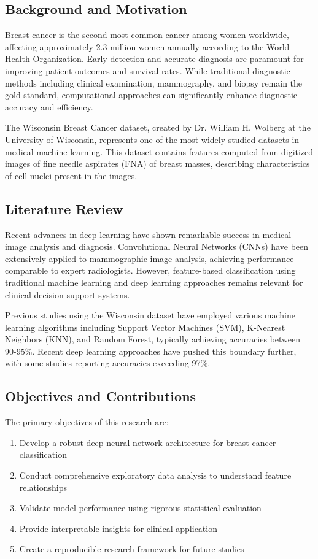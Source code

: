 \documentclass[12pt,a4paper]{article}
\begin{document}
\subsection{Background and Motivation}

Breast cancer is the second most common cancer among women worldwide, affecting approximately 2.3 million women annually according to the World Health Organization. Early detection and accurate diagnosis are paramount for improving patient outcomes and survival rates. While traditional diagnostic methods including clinical examination, mammography, and biopsy remain the gold standard, computational approaches can significantly enhance diagnostic accuracy and efficiency.

The Wisconsin Breast Cancer dataset, created by Dr. William H. Wolberg at the University of Wisconsin, represents one of the most widely studied datasets in medical machine learning. This dataset contains features computed from digitized images of fine needle aspirates (FNA) of breast masses, describing characteristics of cell nuclei present in the images.

\subsection{Literature Review}

Recent advances in deep learning have shown remarkable success in medical image analysis and diagnosis. Convolutional Neural Networks (CNNs) have been extensively applied to mammographic image analysis, achieving performance comparable to expert radiologists. However, feature-based classification using traditional machine learning and deep learning approaches remains relevant for clinical decision support systems.

Previous studies using the Wisconsin dataset have employed various machine learning algorithms including Support Vector Machines (SVM), K-Nearest Neighbors (KNN), and Random Forest, typically achieving accuracies between 90-95\%. Recent deep learning approaches have pushed this boundary further, with some studies reporting accuracies exceeding 97\%.

\subsection{Objectives and Contributions}

The primary objectives of this research are:

\begin{enumerate}
    \item Develop a robust deep neural network architecture for breast cancer classification
    \item Conduct comprehensive exploratory data analysis to understand feature relationships
    \item Validate model performance using rigorous statistical evaluation
    \item Provide interpretable insights for clinical application
    \item Create a reproducible research framework for future studies
\end{enumerate}
\end{document}

